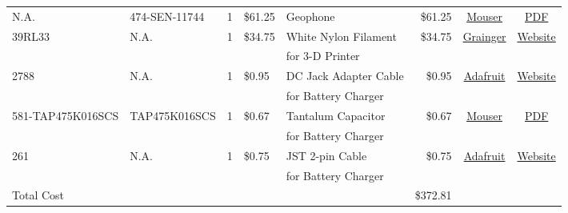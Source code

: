 \documentclass[12pt,landscape]{article}
\begin{document}
\begin{table}[H]
{\begin{tabular}{l|l|c|l|l|r|c|c}
		N.A. & 474-SEN-11744 & 1 & \$61.25 & Geophone & \$61.25 & \href{http://www.mouser.com/ProductDetail/SparkFun-Electronics/SEN-11744/?qs=\%2fha2pyFaduhLW6YoPw5UUIdTRP1X\%252btPruyfOHvl8\%2fY0\%3d}{Mouser} & \href{http://cdn.sparkfun.com/datasheets/Sensors/Accelerometers/SM-24\%20Brochure.pdf}{PDF} \\
    	 39RL33 & N.A. & 1 & \$34.75 & White Nylon Filament & \$34.75 & \href{https://www.grainger.com/product/FILABOT-White-Filament-39RL33}{Grainger} & \href{https://www.grainger.com/product/FILABOT-White-Filament-39RL33}{Website} \\
    	 & & & & for 3-D Printer & & \\
    	 2788 & N.A. & 1 & \$0.95 & DC Jack Adapter Cable & \$0.95 & \href{https://www.adafruit.com/products/2788}{Adafruit} & \href{https://www.adafruit.com/products/2788}{Website} \\
    	 & & & & for Battery Charger & & & \\
    	 581-TAP475K016SCS & TAP475K016SCS & 1 & \$0.67 & Tantalum Capacitor & \$0.67 & \href{http://www.mouser.com/ProductDetail/AVX/TAP475K016SCS/?qs=sGAEpiMZZMtZ1n0r9vR22d\%252b8XmbM9QM8L4TTXY3LGQ8\%3d}{Mouser} & \href{http://www.mouser.com/ds/2/40/tap-776819.pdf}{PDF} \\
    	 & & & & for Battery Charger & & & \\
    	 261 & N.A. & 1 & \$0.75 & JST 2-pin Cable & \$0.75 & \href{https://www.adafruit.com/product/261}{Adafruit} & \href{https://www.adafruit.com/product/261}{Website} \\
    	 & & & & for Battery Charger & & & \\ \hline
    	Total Cost & & & & & \$372.81 &
	\end{tabular}%
	}
    \label{tab:bom}
\end{table}
\end{document}
